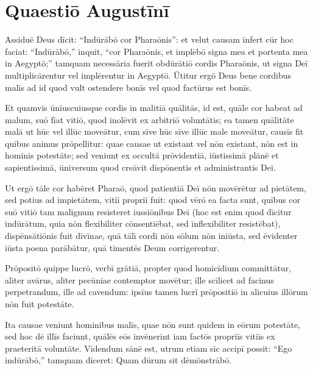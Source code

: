 \section{Quaestiō Augustīnī}

Assiduē Deus dīcit: ``Indūrābō cor Pharaōnis'': et velut causam īnfert cūr hoc
faciat: ``Indūrābō,'' inquit, ``cor Pharaōnis, et implēbō signa mea et portenta
mea in Aegyptō;'' tamquam necessāria fuerit obdūrātiō cordis Pharaōnis, ut
signa Deī multiplicārentur vel implērentur in Aegyptō. Ūtitur ergō Deus
bene cordibus malīs ad id quod vult ostendere bonīs vel quod factūrus est
bonīs. 

Et quamvīs ūnīuscuiusque cordis in
malitiā quālitās, id est, quāle
cor habeat ad malum, suō fīat vitiō, quod inolēvit ex arbitriō voluntātis;
ea tamen quālitāte malā ut hūc vel illūc moveātur, cum sīve hūc sīve illūc
male moveātur, causīs fit quibus animus prōpellitur: quae causae ut
existant vel nōn existant, nōn est in hominis potestāte; sed veniunt ex
occultā prōvidentiā, iūstissimā plānē et sapientissimā, ūniversum quod
creāvit dispōnentis et administrantis Deī. 

Ut ergō tāle cor habēret Pharaō,
quod patientiā Deī nōn movērētur ad pietātem, sed potius ad impietātem,
vitiī propriī fuit: quod vērō ea facta sunt, quibus cor suō vitiō tam
malignum resisteret iussiōnibus Deī (hoc est enim quod dīcitur indūrātum,
quia nōn flexibiliter cōnsentiēbat, sed īnflexibiliter resistēbat),
dispēnsātiōnis fuit dīvīnae, quā tālī cordī nōn sōlum nōn iniūsta, sed
ēvidenter iūsta poena parābātur, quā timentēs Deum corrigerentur.

Prōpositō
quippe lucrō,
verbī grātiā, \linebreak
propter quod homicīdium committātur, aliter
avārus, aliter pecūniae contemptor movētur; ille scīlicet ad facinus
perpetrandum, ille ad cavendum: ipsīus tamen lucrī prōpositiō in alicuius
illōrum nōn fuit potestāte. 

Ita causae veniunt hominibus malīs, quae nōn
sunt quidem in eōrum potestāte, sed hoc dē illīs faciunt, quālēs eōs
invēnerint iam factōs propriīs vitiīs ex praeteritā voluntāte. Videndum
sānē est, utrum etiam sīc accipī possit: ``Ego indūrābō,'' tamquam dīceret:
Quam dūrum sit dēmōnstrābō. 
